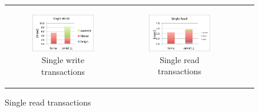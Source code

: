 \begin{figure}[]
  \centering
  \begin{tabular}{cccc}
    
  \begin{subfigure}[t]{0.4\textwidth}
	\includegraphics[width=\textwidth]{figs/singlewrite.pdf}
	\caption[]{Single write transactions}
    \label{fig:latency:lorra1write}
  \end{subfigure} &

  \begin{subfigure}[t]{0.4\textwidth}
	\includegraphics[width=\textwidth]{figs/singleread.pdf}
	\caption[]{Single read transactions}
    \label{fig:latency:lorra1read}
  \end{subfigure} \\


\end{tabular}
\end{figure}
